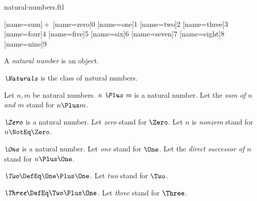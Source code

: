 \documentclass{stex}
\begin{document}
\begin{smodule}{natural-numbers.ftl}


[name=sum]{\,+\,}
[name=zero]{0}
[name=one]{1}
[name=two]{2}
[name=three]{3}
[name=four]{4}
[name=five]{5}
[name=six]{6}
[name=seven]{7}
[name=eight]{8}
[name=nine]{9}


\begin{signature*}[forthel,for=natural number]
  A \emph{natural number} is an object.
\end{signature*}

\begin{definition*}[forthel,for=Naturals]
  $\emph{\Naturals}$ is the class of natural numbers.
\end{definition*}

\begin{signature*}[forthel,for=sum]
  Let $n, m$ be natural numbers.
  $\emph{n \Plus m}$ is a natural number.
  Let the \emph{sum of $n$ and $m$} stand for $n \Plus m$.
\end{signature*}

\begin{signature*}[forthel,for={zero,nonzero}]
  $\emph{\Zero}$ is a natural number.
  Let \emph{zero} stand for $\Zero$.
  Let $n$ is \emph{nonzero} stand for $n \NotEq \Zero$.
\end{signature*}

\begin{signature*}[forthel,for={one,direct successor}]
  $\emph{\One}$ is a natural number.
  Let \emph{one} stand for $\One$.
  Let the \emph{direct successor of $n$} stand for $n \Plus \One$.
\end{signature*}

\begin{definition*}[forthel,for=two]
  $\emph{\Two} \DefEq \One \Plus \One$.
  Let \emph{two} stand for $\Two$.
\end{definition*}

\begin{definition*}[forthel,for=three]
  $\emph{\Three} \DefEq \Two \Plus \One$.
  Let \emph{three} stand for $\Three$.
\end{definition*}


\end{smodule}
\end{document}
